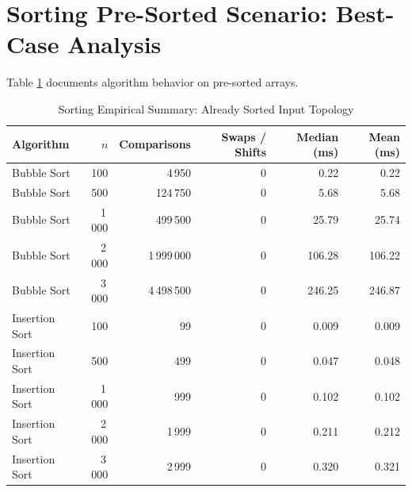 \section{Sorting Pre-Sorted Scenario: Best-Case Analysis}
Table \ref{tab:sorting_sorted_summary} documents algorithm behavior on pre-sorted arrays.

\begin{table}[htbp]
\centering
\caption{Sorting Empirical Summary: Already Sorted Input Topology}
\label{tab:sorting_sorted_summary}
\small
\begin{tabular*}{\textwidth}{@{\extracolsep{\fill}}lrrrrr}
\toprule
\textbf{Algorithm} & $n$ & \textbf{Comparisons} & \textbf{Swaps / Shifts} & \textbf{Median (ms)} & \textbf{Mean (ms)} \\
\midrule
Bubble Sort & 100 & 4\,950 & 0 & 0.22 & 0.22 \\
Bubble Sort & 500 & 124\,750 & 0 & 5.68 & 5.68 \\
Bubble Sort & 1\,000 & 499\,500 & 0 & 25.79 & 25.74 \\
Bubble Sort & 2\,000 & 1\,999\,000 & 0 & 106.28 & 106.22 \\
Bubble Sort & 3\,000 & 4\,498\,500 & 0 & 246.25 & 246.87 \\
\midrule
Insertion Sort & 100 & 99 & 0 & 0.009 & 0.009 \\
Insertion Sort & 500 & 499 & 0 & 0.047 & 0.048 \\
Insertion Sort & 1\,000 & 999 & 0 & 0.102 & 0.102 \\
Insertion Sort & 2\,000 & 1\,999 & 0 & 0.211 & 0.212 \\
Insertion Sort & 3\,000 & 2\,999 & 0 & 0.320 & 0.321 \\
\bottomrule
\end{tabular*}
\end{table}
